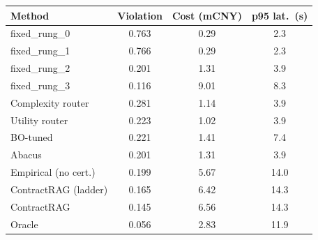 \begin{tabular}{lccc}
\toprule
Method & Violation & Cost (mCNY) & p95 lat.\ (s) \\
\midrule
fixed_rung_0 & 0.763 & 0.29 & 2.3 \\
fixed_rung_1 & 0.766 & 0.29 & 2.3 \\
fixed_rung_2 & 0.201 & 1.31 & 3.9 \\
fixed_rung_3 & 0.116 & 9.01 & 8.3 \\
Complexity router & 0.281 & 1.14 & 3.9 \\
Utility router & 0.223 & 1.02 & 3.9 \\
BO-tuned & 0.221 & 1.41 & 7.4 \\
Abacus & 0.201 & 1.31 & 3.9 \\
Empirical (no cert.) & 0.199 & 5.67 & 14.0 \\
ContractRAG (ladder) & 0.165 & 6.42 & 14.3 \\
ContractRAG & 0.145 & 6.56 & 14.3 \\
Oracle & 0.056 & 2.83 & 11.9 \\
\bottomrule
\end{tabular}